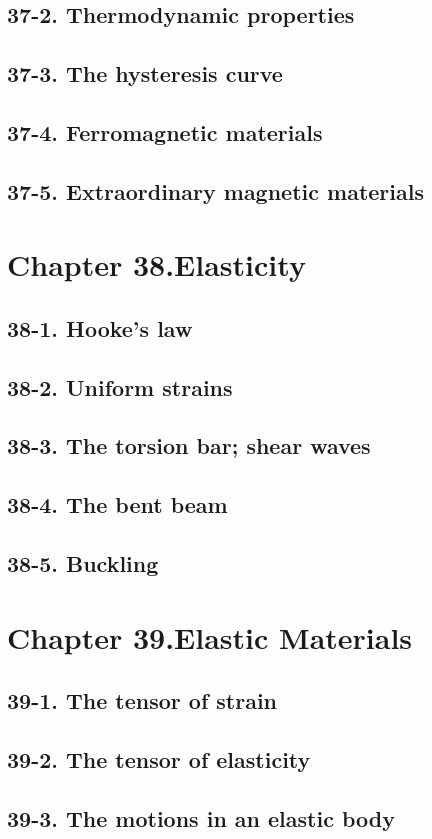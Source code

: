 \documentclass{article}
\begin{document}
\subsection{37-2. Thermodynamic properties}
\subsection{37-3. The hysteresis curve}
\subsection{37-4. Ferromagnetic materials}
\subsection{37-5. Extraordinary magnetic materials}
\section{Chapter 38.Elasticity}
\subsection{38-1. Hooke’s law}
\subsection{38-2. Uniform strains}
\subsection{38-3. The torsion bar; shear waves}
\subsection{38-4. The bent beam}
\subsection{38-5. Buckling}
\section{Chapter 39.Elastic Materials}
\subsection{39-1. The tensor of strain}
\subsection{39-2. The tensor of elasticity}
\subsection{39-3. The motions in an elastic body}
\end{document}
